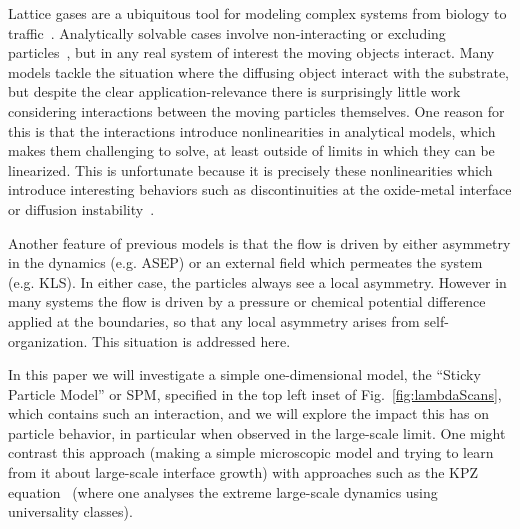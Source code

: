 \documentclass[
reprint, amsmath,amssymb,
]{revtex4-1}
\begin{document}
Lattice gases are a ubiquitous tool for modeling complex systems from
biology to traffic~\cite{1742-5468-2011-07-P07007, Mobilia2007,
  tegner2015high, zhu2012atomic, DealGrove1965, MottCabrera1949,
  Buzzaccaro2007}.  Analytically solvable cases involve
non-interacting or excluding particles~\cite{ladd1988application,
  liggett1985interacting, BenNaim1999, Shandarin1989, Frachebourg1999,
  Frachebourg2000}, but in any real system of interest the moving
objects interact. Many models tackle the situation where the diffusing
object interact with the substrate, but despite the clear
application-relevance there is surprisingly little work considering
interactions between the moving particles themselves.  One reason for
this is that the interactions introduce nonlinearities in analytical
models, which makes them challenging to solve, at least outside of
limits in which they can be linearized. This is unfortunate because it
is precisely these nonlinearities which introduce interesting
behaviors such as discontinuities at the oxide-metal interface or
diffusion instability~\cite{Obukhovsky2017, Gorokhova2010}.

Another feature of previous models is that the flow is driven by
either asymmetry in the dynamics (e.g. ASEP) or an external field
which permeates the system (e.g. KLS).  In either case, the particles
always see a local asymmetry.  However in many systems the flow is
driven by a pressure or chemical potential difference applied at the
boundaries, so that any local asymmetry arises from self-organization.
This situation is addressed here.

In this paper we will investigate a simple one-dimensional model, the
``Sticky Particle Model'' or SPM, specified in the top left inset of
Fig.~\ref{fig:lambdaScans}, which contains such an interaction, and we
will explore the impact this has on particle behavior, in particular
when observed in the large-scale limit.  One might contrast this
approach (making a simple microscopic model and trying to learn from
it about large-scale interface growth) with approaches such as the KPZ
equation~\cite{PhysRevLett.56.889, PhysRevA.38.4271, Sasamoto2010}
(where one analyses the extreme large-scale dynamics using
universality classes).

\end{document}
